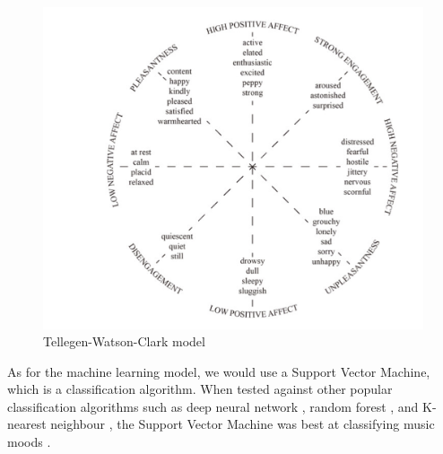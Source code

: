 \begin{figure}
    \centering
    \includegraphics[scale=0.4]{Figures/TWC model}
    \decoRule
    \caption{Tellegen-Watson-Clark model \cite{MoodIoT}}
    \label{fig:TWC}
    \end{figure}

As for the machine learning model, we would use a Support Vector Machine, which is a classification algorithm. When tested against other popular classification algorithms such as deep neural network \cite{MoodDeepNeuralNetwork}, random forest \cite{Moodrandomforest}, and K-nearest neighbour \cite{MoodKNeighbour} \cite{MoodDeepNeuralNetwork}, the Support Vector Machine was best at classifying music moods \cite{MoodIoT}.